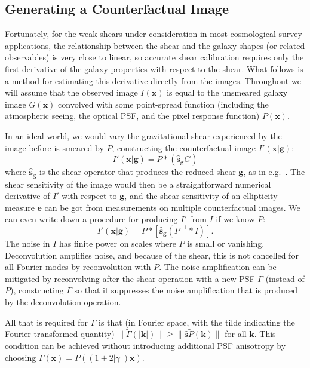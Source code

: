 \documentclass[iop]{emulateapj}
\begin{document}
\subsection{Generating a Counterfactual Image}
\label{sec:counterfactual}
Fortunately, for the weak shears under consideration in most
cosmological survey applications, the relationship between the shear
and the galaxy shapes (or related observables) is very close to
linear, so accurate shear calibration requires only the first
derivative of the galaxy properties with respect to the shear. What
follows is a method for estimating this derivative directly from the
images. Throughout we will assume that the observed image
$I({\mathbf{x}})$ is equal to the unsmeared galaxy image
$G(\mathbf{x})$ convolved with some point-spread function (including the
atmospheric seeing, the optical PSF, and the pixel response function) $P(\mathbf{x})$.

In an ideal world, we would vary the gravitational shear experienced
by the image before is smeared by $P$, constructing the counterfactual
image $I'(\mathbf{x}| {\boldsymbol g})$:
\begin{equation}
  I'({\mathbf{x}}|\mathbf{g}) = P \ast\left( \hat{\mathbf{s}}_{\mathbf{g}}G\right)
\end{equation}
where $\hat{\mathbf{s}}_{\boldsymbol g}$ is the shear operator that
produces the reduced shear $\mathbf{g}$, as in
e.g.~\cite{2002AJ....123..583B}. The shear sensitivity of the image
would then be a straightforward numerical derivative of $I'$ with
respect to $\mathbf{g}$, and the shear sensitivity of an ellipticity
measure $\mathbf{e}$ can be got from measurements on multiple
counterfactual images. We can even write down a procedure for
producing $I'$ from $I$ if we know $P$:
\begin{equation}
  I'({\mathbf{x}}|\mathbf{g}) = P \ast \left[\hat{\mathbf{s}}_\mathbf{g}\left( P^{-1} \ast I \right)\right].
\end{equation}
The noise in $I$ has finite power on scales where $P$ is small or
vanishing. Deconvolution amplifies noise, and because of the shear,
this is not cancelled for all Fourier modes by reconvolution with $P$.  The noise
amplification can be mitigated by reconvolving after the shear
operation with a new PSF $\Gamma$ (instead of $P$), constructing
$\Gamma$ so that it suppresses the noise amplification that is
produced by the deconvolution operation.

All that is required for $\Gamma$ is that (in Fourier space, with the
tilde indicating the Fourier transformed quantity)
$\|\tilde{\Gamma}(\mathbf{|k|}) \| \geq
\|\hat{\mathbf{s}}\tilde{P}(\mathbf{k})\|$
for all $\mathbf{k}$.  This condition can be achieved  without introducing additional
PSF anisotropy by choosing
$\Gamma(\mathbf{x}) = P\left((1+2|\gamma|)\mathbf{x}\right)$.
\end{document}
